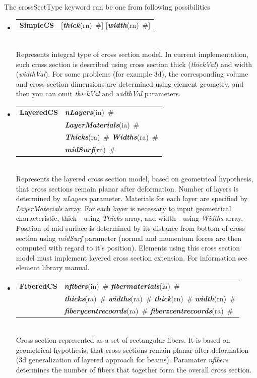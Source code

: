 \documentclass[a4paper]{article}
\makeatletter
\newcommand{\param}[1]{{\em #1}}
\newcommand{\keywordnotype}[1]{\mbox{{\it{\bf{#1}}}}}
\newcommand{\keyword}[2]{\mbox{{\keywordnotype{#1}\tiny (#2)}}}
\newcommand{\entKeywordInst}[1]{\mbox{{\bf{{#1}}}}}
\newcommand{\field}[2]{\mbox{\keyword{#1}{#2}~\#}}
\newcommand{\optField}[2]{\mbox{[\field{#1}{#2}]}}
\newenvironment{record}[1][]{\begin{tabular}{|ll}}{\end{tabular}\\}
\newcommand{\recentry}[2]{{#1}&{#2}\\}
\newcounter{rcc}
\newenvironment{record}[1][\textwidth]{\setcounter{rcc}{0}\begin{tabular*}{#1}{|ll@{\extracolsep{\fill}}r}}{\end{tabular*}\\}
\newcommand{\recentry}[2]{\ifthenelse{\value{rcc}>0}{&$\backslash$ \\}{\setcounter{rcc}{1}}{#1}&{#2}}
\makeatother
\begin{document}
The crossSectType keyword can be one from following possibilities
\begin{itemize}
\item
  \begin{record}[0.9\textwidth]
  \recentry{\entKeywordInst{SimpleCS}}{\optField{thick}{rn} \optField{width}{rn}}
  \end{record}
Represents integral type of cross section model. In current
implementation, such cross section is described using cross section
thick (\param{thickVal}) and width (\param{widthVal}). For some
problems (for example
3d), the corresponding volume and cross section dimensions are
determined using element geometry, and then you can omit \param{thickVal} and \param{widthVal}
parameters.
\item
  \begin{record}[0.9\textwidth]
    \recentry{\entKeywordInst{LayeredCS}}{\field{nLayers}{in}}
    \recentry{}{\field{LayerMaterials}{ia}}
    \recentry{}{\field{Thicks}{ra} \field{Widths}{ra}}
    \recentry{}{\field{mid\-Surf}{rn}}
  \end{record}
Represents the layered cross section model, based on
geometrical hypothesis, that cross sections remain planar after
deformation. Number of layers is
determined by \param{nLayers} parameter. Materials for each
layer are specified by \param{LayerMaterials} array. For each layer is
necessary to input
geometrical characteristic, thick - using \param{Thicks} array, and
width - using
\param{Widths} array. Position of mid surface is determined by its
distance from
bottom of cross section using \param{mid\-Surf} parameter (normal and
momentum forces are then computed with regard to it's position).
Elements using this cross section model must implement layered cross
section extension. For information see element library manual.
\item
  \begin{record}[0.9\textwidth]
    \recentry{\entKeywordInst{FiberedCS}}{\field{nfibers}{in} \field{fibermaterials}{ia}}
    \recentry{}{\field{thicks}{ra} \field{widths}{ra} \field{thick}{rn} \field{width}{rn}}
    \recentry{}{\field{fiberycentrecoords}{ra} \field{fiberzcentrecoords}{ra}}
  \end{record}
  Cross section represented as a set of rectangular fibers. It is based on
geometrical hypothesis, that cross sections remain planar after
deformation (3d generalization of layered approach for beams).
Paramater \param{nfibers} determines the number of fibers that together form the overall cross section.

\end{itemize}
\end{document}

